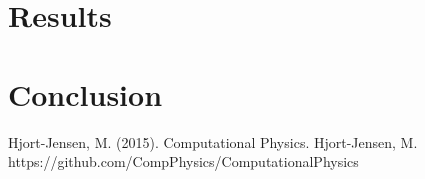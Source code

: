 \documentclass[twoside,twocolumn]{article}
\begin{document}
\section{Results}






\section{Conclusion}


\begin{thebibliography}{99} %
Hjort-Jensen, M. (2015).
\newblock Computational Physics.
Hjort-Jensen, M.
\newblock https://github.com/CompPhysics/ComputationalPhysics

 
\end{thebibliography}

\end{document}
